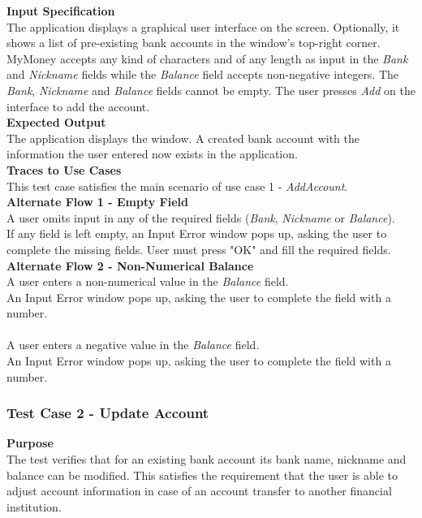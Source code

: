 \documentclass[12pt]{article}
\begin{document}
\noindent
    {\bf Input Specification}\\
    The application displays a graphical user interface on the screen.
    Optionally, it shows a list of pre-existing bank accounts in the window's top-right corner.
    MyMoney accepts any kind of characters and of any length as input in the \textit{Bank} and \textit{Nickname} fields while
    the \textit{Balance} field accepts non-negative integers. The \textit{Bank}, \textit{Nickname} and \textit{Balance} fields cannot be empty.
    The user presses \textit{Add} on the interface to add the account.\\
    
\noindent
    {\bf Expected Output}\\
    The application displays the window.
    A created bank account with the information the user entered now exists in the application.\\
    
\noindent
    {\bf Traces to Use Cases}\\
    This test case satisfies the main scenario of use case 1 - \textit{AddAccount}.\\
    
\noindent
{\bf Alternate Flow 1 - Empty Field}\\
A user omits input in any of the required fields (\textit{Bank}, \textit{Nickname} or \textit{Balance}). \\ 
If any field is left empty, an Input Error window pops up, asking the user to complete the missing fields. User must press "OK" and fill the required fields.\\

\noindent
{\bf Alternate Flow 2 - Non-Numerical Balance}\\
A user enters a non-numerical value in the \textit{Balance} field. \\
An Input Error window pops up, asking the user to complete the field with a number. \\

\\
A user enters a negative value in the \textit{Balance} field. \\
An Input Error window pops up, asking the user to complete the field with a number. \\

\clearpage
\subsubsection{Test Case 2 - Update Account} \label{TC-2}
\noindent
{\bf Purpose}\\
        The test verifies that for an existing bank account its bank name, nickname and balance can be modified.
        This satisfies the requirement that the user is able to adjust account information in case of an account transfer
        to another financial institution. \\
\end{document}
